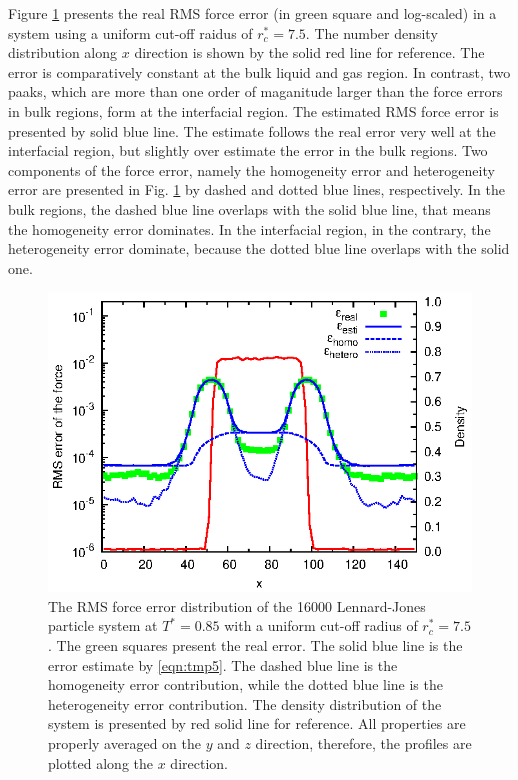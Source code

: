 \documentclass[aps,pre,preprint]{revtex4}
\begin{document}
Figure \ref{fig:tmp2} presents the real RMS force error (in green
square and log-scaled) in a system using a uniform cut-off raidus of $r_c^\ast =
7.5$. The number density distribution along $x$ direction is shown by
the solid red line for reference.  The error is comparatively constant
at the bulk liquid and gas region. In contrast, two paaks, which are
more than one order of maganitude larger than the force errors in bulk
regions, form at the interfacial region.  The estimated RMS force
error is presented by solid blue line.  The estimate follows the real
error very well at the interfacial region, but slightly over estimate
the error in the bulk regions.  Two components of the force error,
namely the homogeneity error and heterogeneity error are presented in
Fig. \ref{fig:tmp2} by dashed and dotted blue lines, respectively.  In
the bulk regions, the dashed blue line overlaps with the solid blue
line, that means the homogeneity error dominates.  In the interfacial
region, in the contrary, the heterogeneity error dominate, because the
dotted blue line overlaps with the solid one.

\begin{figure}
  \centering
  \includegraphics[]{fig/t0.85-n16000-rc07.5uni/error.uniform.eps}
  \caption{The RMS force error distribution of the 16000 Lennard-Jones
    particle system at $T^\ast=0.85$ with a uniform cut-off radius of
    $r_c^\ast = 7.5$. The green squares present the real error. The
    solid blue line is the error estimate by \eqref{eqn:tmp5}. The
    dashed blue line is the homogeneity error contribution, while the
    dotted blue line is the heterogeneity error contribution. The
    density distribution of the system is presented by red solid line
    for reference.  All properties are properly averaged on the $y$
    and $z$ direction, therefore, the profiles are plotted along the
    $x$ direction.  }
  \label{fig:tmp2}
\end{figure}
\end{document}
